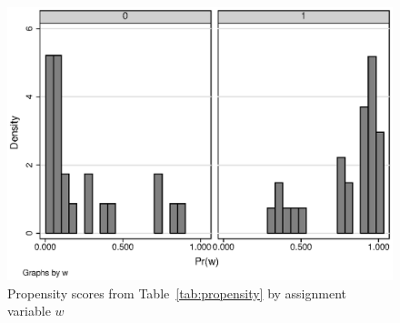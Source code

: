 \begin{figure}
   \centering
   \includegraphics[angle=0,
           width=.75\textwidth]{propplot.eps}
   \caption{Propensity scores from Table~\ref{tab:propensity} by assignment variable $w$ }
  \label{fig:propplot}
\end{figure}